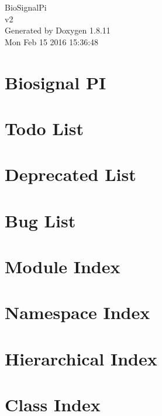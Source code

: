 \documentclass[twoside]{book}
\newcommand{\+}{\discretionary{\mbox{\scriptsize$\hookleftarrow$}}{}{}}
\newcommand{\clearemptydoublepage}{%
  \newpage{\pagestyle{empty}\cleardoublepage}%
}
\begin{document}
\hypersetup{pageanchor=false,
             bookmarks=true,
             bookmarksnumbered=true,
             pdfencoding=unicode
            }
\begin{titlepage}
\vspace*{7cm}
\begin{center}%
{\Large Bio\+Signal\+Pi \\[1ex]\large v2 }\\
\vspace*{1cm}
{\large Generated by Doxygen 1.8.11}\\
\vspace*{0.5cm}
{\small Mon Feb 15 2016 15:36:48}\\
\end{center}
\end{titlepage}
\clearemptydoublepage
\tableofcontents
\clearemptydoublepage
{}
\hypersetup{pageanchor=true}

\chapter{Biosignal PI}
\label{index}\hypertarget{index}{}
\chapter{Todo List}
\label{todo}
\hypertarget{todo}{}

\chapter{Deprecated List}
\label{deprecated}
\hypertarget{deprecated}{}

\chapter{Bug List}
\label{bug}
\hypertarget{bug}{}

\chapter{Module Index}

\chapter{Namespace Index}

\chapter{Hierarchical Index}

\chapter{Class Index}

\end{document}
